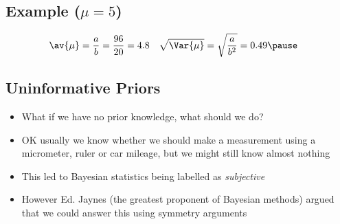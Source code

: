 
\begin{slide}
\section[-2]{Example ($\mu=5$)}
\pb
\pause{}
\begin{center}
  \pause
\end{center}
\vspace*{-1cm}
\begin{align*}
  \av{\mu} &= \frac{a}{b} = \frac{96}{20} = 4.8 &
  \sqrt{\Var{\mu}} &=  \sqrt{\frac{a}{b^2}} = 0.49\pause
\end{align*}
\end{slide}

\Outline

\begin{slide}
\section{Uninformative Priors}

\begin{PauseHighLight}
  \begin{itemize}
  \item What if we have no prior knowledge, what should we do?\pause
  \item OK usually we know whether we should make a measurement using a
    micrometer, ruler or car mileage, but we might still know almost
    nothing\pause
  \item This led to Bayesian statistics being labelled as
    \textit{subjective}\pause
  \item However Ed. Jaynes (the greatest proponent of Bayesian methods)
    argued that we could answer this using symmetry arguments\pause
  \end{itemize}
\end{PauseHighLight}

\end{slide}



